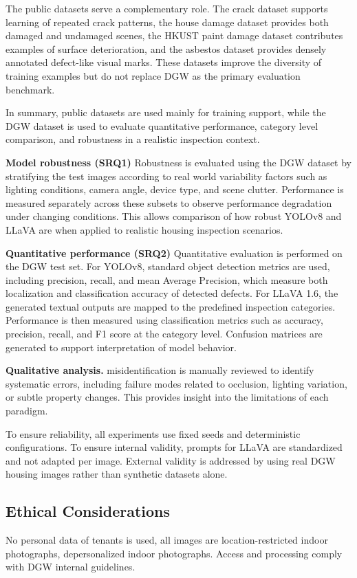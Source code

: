 The public datasets serve a complementary role. The crack dataset supports learning of repeated crack patterns, the house damage dataset provides both damaged and undamaged scenes, the HKUST paint damage dataset contributes examples of surface deterioration, and the asbestos dataset provides densely annotated defect-like visual marks. These datasets improve the diversity of training examples but do not replace DGW as the primary evaluation benchmark.

In summary, public datasets are used mainly for training support, while the DGW dataset is used to evaluate quantitative performance, category level comparison, and robustness in a realistic inspection context.

\textbf{Model robustness (SRQ1)}  
Robustness is evaluated using the DGW dataset by stratifying the test images according to real world variability factors such as lighting conditions, camera angle, device type, and scene clutter. Performance is measured separately across these subsets to observe performance degradation under changing conditions. This allows comparison of how robust YOLOv8 and LLaVA are when applied to realistic housing inspection scenarios.

\textbf{Quantitative performance (SRQ2)}  
Quantitative evaluation is performed on the DGW test set. For YOLOv8, standard object detection metrics are used, including precision, recall, and mean Average Precision, which measure both localization and classification accuracy of detected defects. For LLaVA 1.6, the generated textual outputs are mapped to the predefined inspection categories. Performance is then measured using classification metrics such as accuracy, precision, recall, and F1 score at the category level. Confusion matrices are generated to support interpretation of model behavior.

\textbf{Qualitative analysis.}  
misidentification is manually reviewed to identify systematic errors, including failure modes related to occlusion, lighting variation, or subtle property changes. This provides insight into the limitations of each paradigm.

To ensure reliability, all experiments use fixed seeds and deterministic configurations. To ensure internal validity, prompts for LLaVA are standardized and not adapted per image. External validity is addressed by using real DGW housing images rather than synthetic datasets alone.

\subsection{Ethical Considerations}
No personal data of tenants is used, all images are location-restricted indoor photographs, depersonalized indoor photographs. Access and processing comply with DGW internal guidelines.
